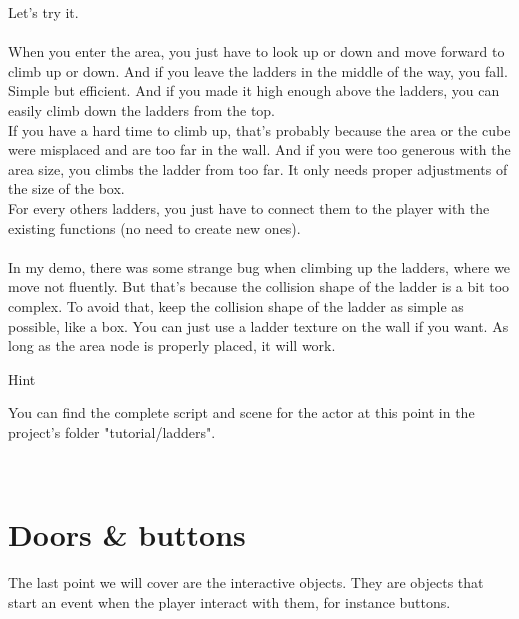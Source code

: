 \documentclass[10pt,a4paper]{article}
\newenvironment{hint}{%
\begin{bclogo}[logo=\bcinfo, couleurBarre=Green, noborder=true, 
               couleur=white]{Hint}
}{%
\end{bclogo}\hspace{1px}\\
}
\begin{document}
Let's try it.\\
\\
When you enter the area, you just have to look up or down and move forward to climb up or down. And if you leave the ladders in the middle of the way, you fall. Simple but efficient. And if you made it high enough above the ladders, you can easily climb down the ladders from the top.\\
If you have a hard time to climb up, that's probably because the area or the cube were misplaced and are too far in the wall. And if you were too generous with the area size, you climbs the ladder from too far. It only needs proper adjustments of the size of the box.\\
For every others ladders, you just have to connect them to the player with the existing functions (no need to create new ones).\\
\\
In my demo, there was some strange bug when climbing up the ladders, where we move not fluently. But that's because the collision shape of the ladder is a bit too complex. To avoid that, keep the collision shape of the ladder as simple as possible, like a box. You can just use a ladder texture on the wall if you want. As long as the area node is properly placed, it will work.

\begin{hint}
You can find the complete script and scene for the actor at this point in the project's folder "tutorial/ladders". 
\end{hint}

\section{Doors \& buttons}
The last point we will cover are the interactive objects. They are objects that start an event when the player interact with them, for instance buttons. 
\end{document}

